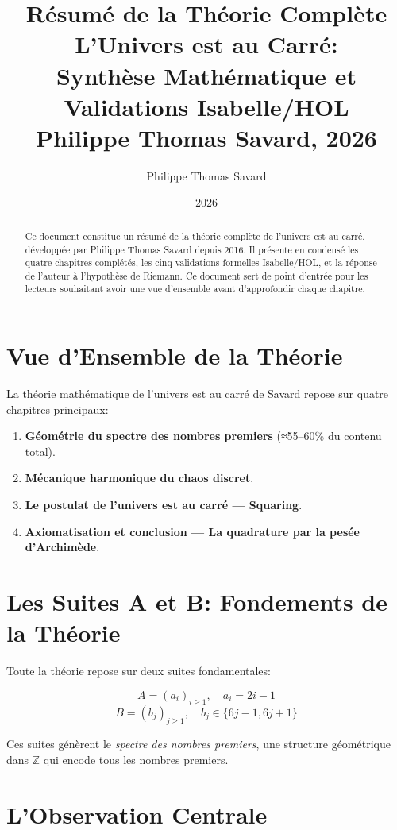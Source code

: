 \documentclass[12pt,a4paper]{article}
\title{%
  \textbf{Résumé de la Théorie Complète}\\[0.5em]
  \Large L'Univers est au Carré:\\
  Synthèse Mathématique et Validations Isabelle/HOL\\[0.5em]
  \large Philippe Thomas Savard, 2026
}
\author{Philippe Thomas Savard}
\date{2026}
\begin{document}
\maketitle
\tableofcontents
\newpage

\begin{abstract}
Ce document constitue un résumé de la théorie complète de l'univers est au carré,
développée par Philippe Thomas Savard depuis 2016. Il présente en condensé les quatre
chapitres complétés, les cinq validations formelles Isabelle/HOL, et la réponse
de l'auteur à l'hypothèse de Riemann. Ce document sert de point d'entrée pour les
lecteurs souhaitant avoir une vue d'ensemble avant d'approfondir chaque chapitre.
\end{abstract}

\section{Vue d'Ensemble de la Théorie}

La théorie mathématique de l'univers est au carré de Savard repose sur quatre chapitres
principaux:

\begin{enumerate}
  \item \textbf{Géométrie du spectre des nombres premiers} (≈55--60\% du contenu total).
  \item \textbf{Mécanique harmonique du chaos discret}.
  \item \textbf{Le postulat de l'univers est au carré — Squaring}.
  \item \textbf{Axiomatisation et conclusion — La quadrature par la pesée d'Archimède}.
\end{enumerate}

\section{Les Suites A et B: Fondements de la Théorie}

Toute la théorie repose sur deux suites fondamentales:

\[
  A = (a_i)_{i \geq 1}, \quad a_i = 2i - 1
\]
\[
  B = (b_j)_{j \geq 1}, \quad b_j \in \{6j-1, 6j+1\}
\]

Ces suites génèrent le \emph{spectre des nombres premiers}, une structure géométrique
dans $\mathbb{Z}$ qui encode tous les nombres premiers.

\section{L'Observation Centrale}
\end{document}

